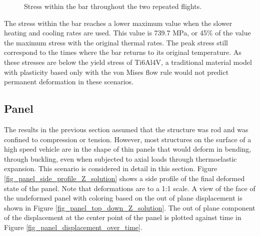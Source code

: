 \documentclass[conf]{new-aiaa}
\begin{document}
\begin{figure}[H]
  \centering
  \caption{ Stress within the bar throughout the two repeated flights.}
  \label{fig_slow_full_bar_stress}
\end{figure}

The stress within the bar reaches a lower maximum value 
when the slower heating and cooling rates are used.
This value is 739.7 MPa, or 45\% of the value
the maximum stress with the original thermal rates.
The peak stress still correspond to the times where
the bar returns to its original temperature.
As these stresses are below the yield stress of Ti6Al4V, 
a traditional material model with plasticity based only with the
von Mises flow rule would not predict permanent deformation 
in these scenarios.

\subsection{Panel}

The results in the previous section assumed that the structure 
was rod and was confined to compression or tension. 
However, most structures on the surface of a high speed vehicle 
are in the shape of thin panels that would deform in 
bending, through buckling, even when subjected to axial loads 
through thermoelastic expansion. 
This scenario is considered in detail in this section. 
Figure \ref{fig_panel_side_profile_Z_solution} 
shows a side profile of the final deformed
state of the panel. Note that deformations are to a 1:1 scale.
A view of the face of the undeformed panel with coloring based on the 
out of plane displacement is shown in Figure \ref{fig_panel_top_down_Z_solution}.
The out of plane component of the displacement at the center point 
of the panel is plotted against time in Figure \ref{fig_panel_displacement_over_time}.
\end{document}
